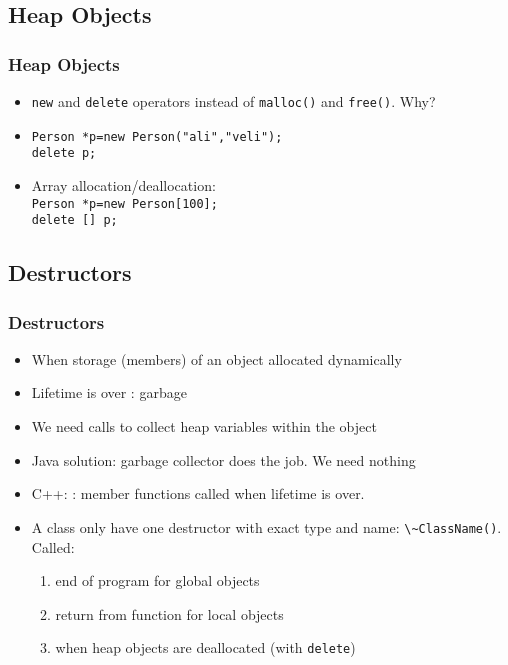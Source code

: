 \subsection{Heap Objects}
\begin{frame}
\frametitle{Heap Objects}
\begin{itemize}
\item \lstinline!new! and \lstinline!delete! operators
	instead of \texttt{malloc()} and \texttt{free()}. Why?
\item \lstinline!Person *p=new Person("ali","veli");!\\
	\lstinline!delete p;!
\item Array allocation/deallocation:\\
	\lstinline!Person *p=new Person[100];!\\
	\lstinline!delete [] p;!
\end{itemize}
\end{frame}

\subsection{Destructors}
\begin{frame}
\frametitle{Destructors}
\begin{itemize}
\item When storage (members) of an object allocated dynamically
\item Lifetime is over : garbage
\item We need calls to collect heap variables within the object
\item Java solution: garbage collector does the job. We need nothing
\item C++: : member functions called when lifetime
	is over.
\item A class only have one destructor with exact type and name: \lstinline!\~ClassName()!.
	Called:
\begin{enumerate}
\item	end of program for global objects
\item	return from function for local objects
\item   when heap objects are deallocated (with \lstinline!delete!)
\end{enumerate}
\end{itemize}
\end{frame}

